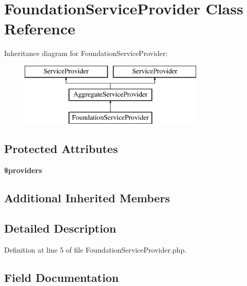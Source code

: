 \section{Foundation\+Service\+Provider Class Reference}
\label{class_illuminate_1_1_foundation_1_1_providers_1_1_foundation_service_provider}
Inheritance diagram for Foundation\+Service\+Provider\+:\begin{figure}[H]
\begin{center}
\leavevmode
\includegraphics[height=3.000000cm]{class_illuminate_1_1_foundation_1_1_providers_1_1_foundation_service_provider}
\end{center}
\end{figure}
\subsection*{Protected Attributes}
\begin{DoxyCompactItemize}
\item 
{\bf \$providers}
\end{DoxyCompactItemize}
\subsection*{Additional Inherited Members}


\subsection{Detailed Description}


Definition at line 5 of file Foundation\+Service\+Provider.\+php.



\subsection{Field Documentation}

